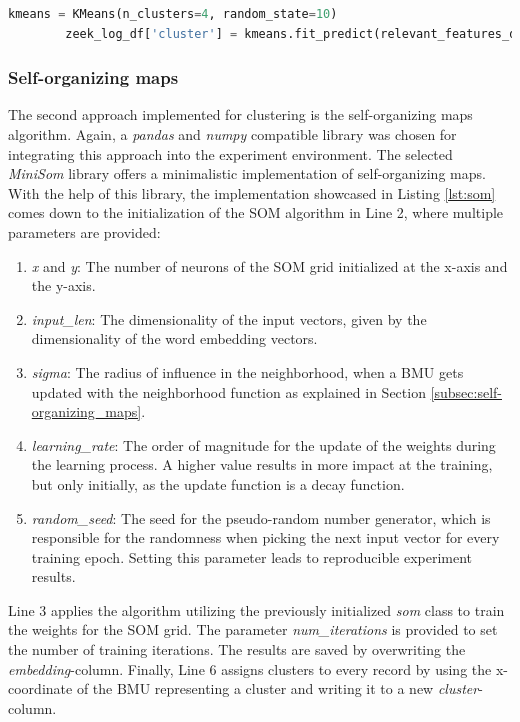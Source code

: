\begin{minipage}\linewidth
	\begin{lstlisting}[language={python}, caption={Application of k-means clustering on the previously calculated embeddings}, label={lst:k_means}] 
        kmeans = KMeans(n_clusters=4, random_state=10)
        zeek_log_df['cluster'] = kmeans.fit_predict(relevant_features_df['embedding'].tolist())
	\end{lstlisting}
\end{minipage}



\subsubsection{Self-organizing maps}
The second approach implemented for clustering is the self-organizing maps algorithm. Again, a \emph{pandas} and \emph{numpy} compatible library was chosen for integrating this approach into the experiment environment. The selected \emph{MiniSom} library \cite{vettigliminisom} offers a minimalistic implementation of self-organizing maps. With the help of this library, the implementation showcased in Listing \ref{lst:som} comes down to the initialization of the SOM algorithm in Line 2, where multiple parameters are provided:
\begin{enumerate}
	\item \emph{x} and \emph{y}: The number of neurons of the SOM grid initialized at the x-axis and the y-axis.
	\item \emph{input\_len}: The dimensionality of the input vectors, given by the dimensionality of the word embedding vectors.
	\item \emph{sigma}: The radius of influence in the neighborhood, when a BMU gets updated with the neighborhood function as explained in Section \ref{subsec:self-organizing_maps}.
	\item \emph{learning\_rate}: The order of magnitude for the update of the weights during the learning process. A higher value results in more impact at the training, but only initially, as the update function is a decay function.
	\item \emph{random\_seed}: The seed for the pseudo-random number generator, which is responsible for the randomness when picking the next input vector for every training epoch. Setting this parameter leads to reproducible experiment results.
\end{enumerate}

Line 3 applies the algorithm utilizing the previously initialized \emph{som} class to train the weights for the SOM grid. The parameter \emph{num\_iterations} is provided to set the number of training iterations. The results are saved by overwriting the \emph{embedding}-column. Finally, Line 6 assigns clusters to every record by using the x-coordinate of the BMU representing a cluster and writing it to a new \emph{cluster}-column.

